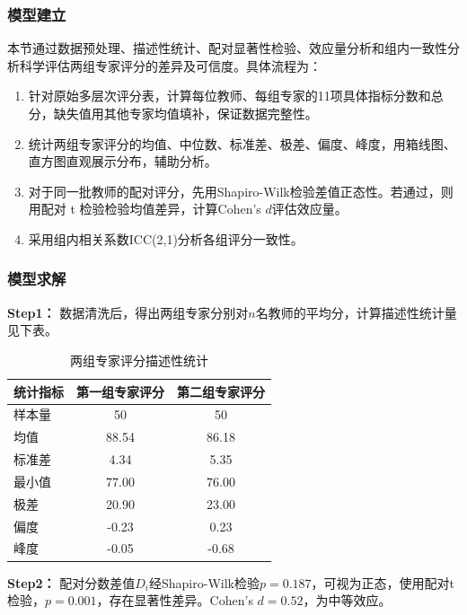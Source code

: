 \documentclass[withoutpreface,bwprint]{cumcmthesis}
\begin{document}
\subsubsection{模型建立}
本节通过数据预处理、描述性统计、配对显著性检验、效应量分析和组内一致性分析科学评估两组专家评分的差异及可信度。具体流程为：
\begin{enumerate}
    \item 针对原始多层次评分表，计算每位教师、每组专家的11项具体指标分数和总分，缺失值用其他专家均值填补，保证数据完整性。
    \item 统计两组专家评分的均值、中位数、标准差、极差、偏度、峰度，用箱线图、直方图直观展示分布，辅助分析。
    \item 对于同一批教师的配对评分，先用Shapiro-Wilk检验差值正态性。若通过，则用配对 t 检验检验均值差异，计算Cohen's $d$评估效应量。
    \item 采用组内相关系数ICC(2,1)分析各组评分一致性。
\end{enumerate}

\subsubsection{模型求解}
\textbf{Step1：} 数据清洗后，得出两组专家分别对$n$名教师的平均分，计算描述性统计量见下表。

\begin{table}[H]
\centering
\caption{两组专家评分描述性统计}
\label{tab:descstat}
\begin{tabular}{lcc}
\toprule
统计指标 & 第一组专家评分 & 第二组专家评分 \\
\midrule
样本量      & 50        & 50        \\
均值        & 88.54     & 86.18     \\
标准差      & 4.34      & 5.35      \\
最小值      & 77.00     & 76.00     \\
极差        & 20.90     & 23.00     \\
偏度        & -0.23     & 0.23      \\
峰度        & -0.05     & -0.68     \\
\bottomrule
\end{tabular}
\end{table}








\textbf{Step2：} 配对分数差值$D_i$经Shapiro-Wilk检验$ p = 0.187 $，可视为正态，使用配对t检验，$p=0.001$，存在显著性差异。Cohen's $d=0.52$，为中等效应。
\end{document}
